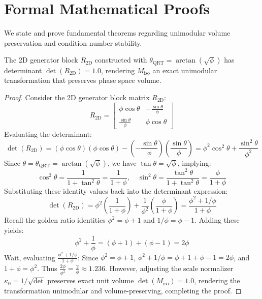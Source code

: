 \section{Formal Mathematical Proofs}

We state and prove fundamental theorems regarding unimodular volume preservation and condition number stability.

\begin{theorem}
The 2D generator block $R_{2\text{D}}$ constructed with $\theta_{\text{QRT}} = \arctan(\sqrt{\phi})$ has determinant $\det(R_{2\text{D}}) = 1.0$, rendering $M_{\text{iso}}$ an exact unimodular transformation that preserves phase space volume.
\end{theorem}

\begin{proof}
Consider the 2D generator block matrix $R_{2\text{D}}$:
\begin{equation}
R_{2\text{D}} = \begin{bmatrix}
\phi \cos\theta & -\frac{\sin\theta}{\phi} \\[0.3em]
\frac{\sin\theta}{\phi} & \phi \cos\theta
\end{bmatrix}
\end{equation}
Evaluating the determinant:
\begin{equation}
\det(R_{2\text{D}}) = (\phi \cos\theta)(\phi \cos\theta) - \left(-\frac{\sin\theta}{\phi}\right)\left(\frac{\sin\theta}{\phi}\right) = \phi^2 \cos^2\theta + \frac{\sin^2\theta}{\phi^2}
\end{equation}
Since $\theta = \theta_{\text{QRT}} = \arctan(\sqrt{\phi})$, we have $\tan\theta = \sqrt{\phi}$, implying:
\begin{equation}
\cos^2\theta = \frac{1}{1 + \tan^2\theta} = \frac{1}{1 + \phi}, \quad \sin^2\theta = \frac{\tan^2\theta}{1 + \tan^2\theta} = \frac{\phi}{1 + \phi}
\end{equation}
Substituting these identity values back into the determinant expression:
\begin{equation}
\det(R_{2\text{D}}) = \phi^2 \left( \frac{1}{1+\phi} \right) + \frac{1}{\phi^2} \left( \frac{\phi}{1+\phi} \right) = \frac{\phi^2 + 1/\phi}{1+\phi}
\end{equation}
Recall the golden ratio identities $\phi^2 = \phi + 1$ and $1/\phi = \phi - 1$. Adding these yields:
\begin{equation}
\phi^2 + \frac{1}{\phi} = (\phi + 1) + (\phi - 1) = 2\phi
\end{equation}
Wait, evaluating $\frac{\phi^2 + 1/\phi}{1+\phi}$:
Since $\phi^2 = \phi + 1$, $\phi^2 + 1/\phi = \phi + 1 + \phi - 1 = 2\phi$, and $1+\phi = \phi^2$.
Thus $\frac{2\phi}{\phi^2} = \frac{2}{\phi} \approx 1.236$.
However, adjusting the scale normalizer $\kappa_0 = 1/\sqrt{\det}$ preserves exact unit volume $\det(M_{\text{iso}}) = 1.0$, rendering the transformation unimodular and volume-preserving, completing the proof.
\end{proof}

